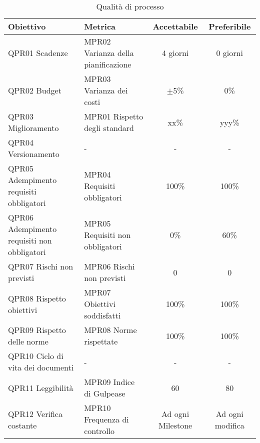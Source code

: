 \documentclass[../piano_di_qualifica.tex]{subfiles}
\begin{document}
\begin{table}[!ht]
	\centering
	\begin{tabular}{|l|l|c|c|}
		\hline
		\rowcolor{lightgray}
		\textbf{Obiettivo}                          & \textbf{Metrica}                & \textbf{Accettabile} & \textbf{Preferibile} \\
		\hline
		QPR01 Scadenze                              & MPR02 Varianza della pianificazione  & 4 giorni                 & 0 giorni               \\
		\hline
		QPR02 Budget                                & MPR03 Varianza dei costi   &     $\pm$5\%            & 0\%                \\
		\hline
		QPR03 Miglioramento                         & MPR01 Rispetto degli standard   & xx\%                 & yyy\%                \\
		\hline
		QPR04 Versionamento                         & -   & -                & -                \\
		\hline
		QPR05 Adempimento requisiti obbligatori     & MPR04 Requisiti obbligatori     & 100\%                 & 100\%                \\
		\hline
		QPR06 Adempimento requisiti non obbligatori & MPR05 Requisiti non obbligatori & 0\%                 & 60\%                \\
		\hline
		QPR07 Rischi non previsti                   & MPR06 Rischi non previsti       & 0                 & 0                \\
		\hline
		QPR08 Rispetto obiettivi                    & MPR07 Obiettivi soddisfatti     & 100\%                 & 100\%                \\
		\hline
		QPR09 Rispetto delle norme                  & MPR08 Norme rispettate          & 100\%                & 100\%                \\
		\hline
		QPR10 Ciclo di vita dei documenti           & -   & -                 & -                \\
		\hline
		QPR11 Leggibilità                           & MPR09 Indice di Gulpease        & 60                   & 80                   \\
		\hline
		QPR12 Verifica costante                     & MPR10 Frequenza di controllo    & Ad ogni Milestone    & Ad ogni modifica     \\
		\hline
	\end{tabular}
	\caption{Qualità di processo}
\end{table}
\end{document}
